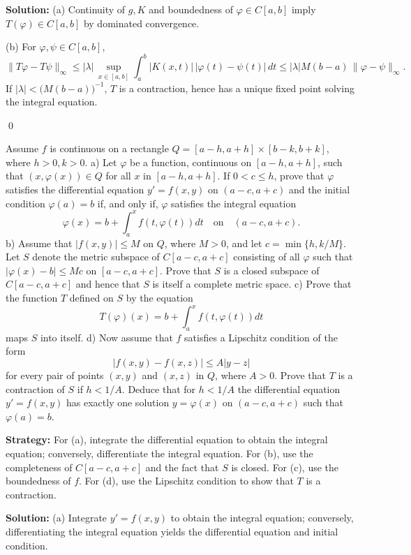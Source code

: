 \bigskip\noindent\textbf{Solution:}
(a) Continuity of $g,K$ and boundedness of $\varphi\in C[a,b]$ imply $T(\varphi)\in C[a,b]$ by dominated convergence.

(b) For $\varphi,\psi\in C[a,b]$,
\[\|T\varphi-T\psi\|_\infty \le |\lambda|\,\sup_{x\in[a,b]}\int_a^b |K(x,t)|\,|\varphi(t)-\psi(t)|\,dt \le |\lambda|M(b-a)\,\|\varphi-\psi\|_\infty.
\]
If $|\lambda|<\big(M(b-a)\big)^{-1}$, $T$ is a contraction, hence has a unique fixed point solving the integral equation.




\qed
\begin{problembox}
Assume $f$ is continuous on a rectangle $Q = [a - h, a + h] \times [b - k, b + k]$, where $h > 0, k > 0$.
a) Let $\varphi$ be a function, continuous on $[a - h, a + h]$, such that $(x, \varphi(x)) \in Q$ for all $x$ in $[a - h, a + h]$. If $0 < c \leq h$, prove that $\varphi$ satisfies the differential equation $y' = f(x, y)$ on $(a - c, a + c)$ and the initial condition $\varphi(a) = b$ if, and only if, $\varphi$ satisfies the integral equation 
\[\varphi(x) = b + \int_a^x f(t, \varphi(t)) dt \quad \text{on} \quad (a - c, a + c).\]
b) Assume that $|f(x, y)| \leq M$ on $Q$, where $M > 0$, and let $c = \min \{h, k/M\}$. Let $S$ denote the metric subspace of $C[a - c, a + c]$ consisting of all $\varphi$ such that $|\varphi(x) - b| \leq Mc$ on $[a - c, a + c]$. Prove that $S$ is a closed subspace of $C[a - c, a + c]$ and hence that $S$ is itself a complete metric space.
c) Prove that the function $T$ defined on $S$ by the equation 
\[T(\varphi)(x) = b + \int_a^x f(t, \varphi(t)) dt\]
maps $S$ into itself.
d) Now assume that $f$ satisfies a Lipschitz condition of the form 
\[|f(x, y) - f(x, z)| \leq A|y - z|\]
for every pair of points $(x, y)$ and $(x, z)$ in $Q$, where $A > 0$. Prove that $T$ is a contraction of $S$ if $h < 1/A$. Deduce that for $h < 1/A$ the differential equation $y' = f(x, y)$ has exactly one solution $y = \varphi(x)$ on $(a - c, a + c)$ such that $\varphi(a) = b$.
\end{problembox}

\noindent\textbf{Strategy:} For (a), integrate the differential equation to obtain the integral equation; conversely, differentiate the integral equation. For (b), use the completeness of $C[a-c,a+c]$ and the fact that $S$ is closed. For (c), use the boundedness of $f$. For (d), use the Lipschitz condition to show that $T$ is a contraction.

\bigskip\noindent\textbf{Solution:}
(a) Integrate $y'=f(x,y)$ to obtain the integral equation; conversely, differentiating the integral equation yields the differential equation and initial condition.

